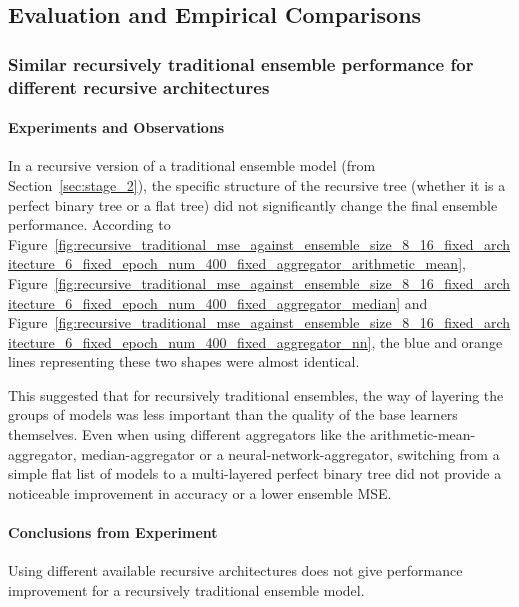 \documentclass{article}
\begin{document}


\subsection{Evaluation and Empirical Comparisons}


\subsubsection{Similar recursively traditional ensemble performance for different recursive architectures}
\paragraph{Experiments and Observations}
In a recursive version of a traditional ensemble model (from Section~\ref{sec:stage_2}), the specific structure of the recursive tree (whether it is a perfect binary tree or a flat tree) did not significantly change the final ensemble performance. According to Figure~\ref{fig:recursive_traditional_mse_against_ensemble_size_8_16_fixed_architecture_6_fixed_epoch_num_400_fixed_aggregator_arithmetic_mean}, Figure~\ref{fig:recursive_traditional_mse_against_ensemble_size_8_16_fixed_architecture_6_fixed_epoch_num_400_fixed_aggregator_median} and Figure~\ref{fig:recursive_traditional_mse_against_ensemble_size_8_16_fixed_architecture_6_fixed_epoch_num_400_fixed_aggregator_nn}, the blue and orange lines representing these two shapes were almost identical. 

This suggested that for recursively traditional ensembles, the way of layering the groups of models was less important than the quality of the base learners themselves. Even when using different aggregators like the arithmetic-mean-aggregator, median-aggregator or a neural-network-aggregator, switching from a simple flat list of models to a multi-layered perfect binary tree did not provide a noticeable improvement in accuracy or a lower ensemble MSE. 

\paragraph{Conclusions from Experiment}
Using different available recursive architectures does not give performance improvement for a recursively traditional ensemble model. 
\end{document}
